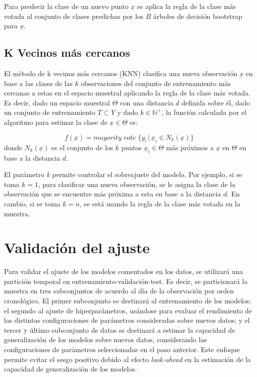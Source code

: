 \documentclass[12pt,a4paper,]{book}
\numberwithin{dummy}{section}
\theoremstyle{ocrenumbox}
\theoremstyle{blacknumex}
\theoremstyle{blacknumbox}
\theoremstyle{ocrenum}
\theoremstyle{ocrenum}
\begin{document}
Para predecir la clase de un nuevo punto \(\underline x\) se aplica la
regla de la clase más votada al conjunto de clases predichas por los
\(B\) árboles de decisión bootstrap para \(\underline x\).

\hypertarget{k-vecinos-muxe1s-cercanos}{%
\subsection{K Vecinos más cercanos}\label{k-vecinos-muxe1s-cercanos}}

El método de k vecinos más cercanos (KNN) clasifica una nueva
observación \(\underline x\) en base a las clases de las \(k\)
observaciones del conjunto de entrenamiento más cercanas a estas en el
espacio muestral aplicando la regla de la clase más votada. Es decir,
dado un espacio muestral \(\Theta\) con una distancia \(d\) definida
sobre él, dado un conjunto de entrenamiento \(T \subset Y\) y dado
\(k \in \mathbb{N^+}\), la función calculada por el algoritmo para
estimar la clase de \(\underline x \in \Theta\) es:

\[f(\underline x) = mayority\; vote\;\{ y_i \,| \, \underline x_i \in N_k(\underline x)\}\]
donde \(N_k(\underline x)\) es el conjunto de los \(k\) puntos
\(\underline x_i \in \Theta\) más próximos a \(\underline x\) en
\(\Theta\) en base a la distancia \(d\).

El parámetro \emph{k} permite controlar el sobreajuste del modelo. Por
ejemplo, si se toma \(k = 1\), para clasificar una nueva observación, se
le asigna la clase de la observación que se encuentre más próxima a esta
en base a la distancia \(d\). En cambio, si se toma \(k=n\), se está
usando la regla de la clase más votada en la muestra.

\hypertarget{validaciuxf3n-del-ajuste}{%
\section{Validación del ajuste}\label{validaciuxf3n-del-ajuste}}

Para validar el ajuste de los modelos comentados en los datos, se
utilizará una partición temporal en entrenamiento-validación-test. Es
decir, se particionará la muestra en tres subconjuntos de acuerdo al día
de la observación por orden cronológico. El primer subconjunto se
destinará al entrenamiento de los modelos; el segundo al ajuste de
hiperparámetros, usándose para evaluar el rendimiento de las distintas
configuraciones de parámetros consideradas sobre nuevos datos; y el
tercer y último subconjunto de datos se destinará a estimar la capacidad
de generalización de los modelos sobre nuevos datos, considerando las
configuraciones de parámetros seleccionadas en el paso anterior. Este
enfoque permite evitar el sesgo positivo debido al efecto
\emph{look-ahead} en la estimación de la capacidad de generalización de
los modelos.
\end{document}
